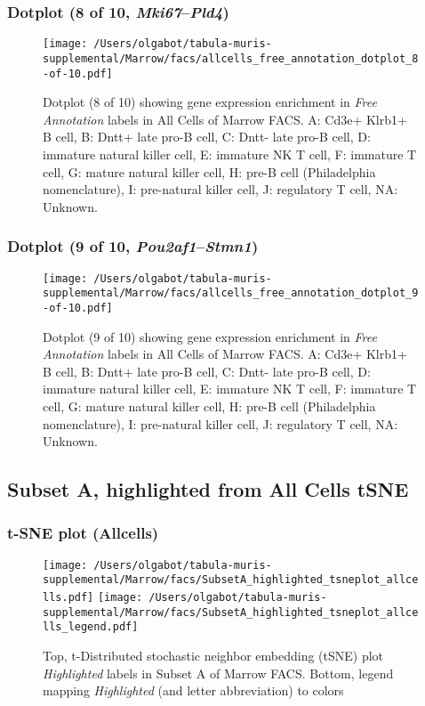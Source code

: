 \clearpage

\subsubsection{Dotplot (8 of 10, \emph{Mki67}--\emph{Pld4})}
\begin{figure}[h]
\centering
\texttt{[image: /Users/olgabot/tabula-muris-supplemental/Marrow/facs/allcells\_free\_annotation\_dotplot\_8-of-10.pdf]}

\caption{ Dotplot (8 of 10)  showing gene expression enrichment in \emph{Free Annotation} labels in All Cells of Marrow FACS. A: Cd3e+ Klrb1+ B cell, B: Dntt+ late pro-B cell, C: Dntt- late pro-B cell, D: immature natural killer cell, E: immature NK T cell, F: immature T cell, G: mature natural killer cell, H: pre-B cell (Philadelphia nomenclature), I: pre-natural killer cell, J: regulatory T cell, NA: Unknown.}
\end{figure}


\clearpage

\subsubsection{Dotplot (9 of 10, \emph{Pou2af1}--\emph{Stmn1})}
\begin{figure}[h]
\centering
\texttt{[image: /Users/olgabot/tabula-muris-supplemental/Marrow/facs/allcells\_free\_annotation\_dotplot\_9-of-10.pdf]}

\caption{ Dotplot (9 of 10)  showing gene expression enrichment in \emph{Free Annotation} labels in All Cells of Marrow FACS. A: Cd3e+ Klrb1+ B cell, B: Dntt+ late pro-B cell, C: Dntt- late pro-B cell, D: immature natural killer cell, E: immature NK T cell, F: immature T cell, G: mature natural killer cell, H: pre-B cell (Philadelphia nomenclature), I: pre-natural killer cell, J: regulatory T cell, NA: Unknown.}
\end{figure}


\clearpage

\subsection{Subset A, highlighted from All Cells tSNE}

\subsubsection{t-SNE plot (Allcells)}
\begin{figure}[h]
\centering
\texttt{[image: /Users/olgabot/tabula-muris-supplemental/Marrow/facs/SubsetA\_highlighted\_tsneplot\_allcells.pdf]}
\texttt{[image: /Users/olgabot/tabula-muris-supplemental/Marrow/facs/SubsetA\_highlighted\_tsneplot\_allcells\_legend.pdf]}
\caption{Top, t-Distributed stochastic neighbor embedding (tSNE) plot  \emph{Highlighted} labels in Subset A of Marrow FACS. Bottom, legend mapping \emph{Highlighted} (and letter abbreviation) to colors}
\end{figure}


